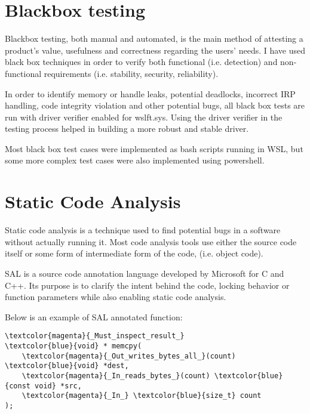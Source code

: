     \pagebreak

    \section{Blackbox testing}
        Blackbox testing, both manual and automated, is the main method of attesting a product's value, usefulness and correctness regarding
        the users' needs. I have used black box techniques in order to verify both functional (i.e. detection) and non-functional requirements
        (i.e. stability, security, reliability).

        In order to identify memory or handle leaks, potential deadlocks, incorrect IRP handling, code integrity violation and other potential
        bugs, all black box tests are run with driver verifier enabled for wslft.sys. Using the driver verifier in the testing process helped
        in building a more robust and stable driver.

        Most black box test cases were implemented as bash scripts running in WSL, but some more complex test cases were also implemented
        using powershell.

    \section{Static Code Analysis}
        Static code analysis is a technique used to find potential bugs in a software without actually running it. Most code analysis tools use
        either the source code itself or some form of intermediate form of the code, (i.e. object code).

        SAL is a source code annotation language developed by Microsoft for C and C++. Its purpose is to clarify the intent behind the code,
        locking behavior or function parameters while also enabling static code analysis.

        Below is an example of SAL annotated function:

    \begin{Verbatim}[fontsize=\small, commandchars=\\\{\}]
\textcolor{magenta}{_Must_inspect_result_}
\textcolor{blue}{void} * memcpy(  
    \textcolor{magenta}{_Out_writes_bytes_all_}(count) \textcolor{blue}{void} *dest,   
    \textcolor{magenta}{_In_reads_bytes_}(count) \textcolor{blue}{const void} *src,   
    \textcolor{magenta}{_In_} \textcolor{blue}{size_t} count  
);  
    \end{Verbatim}

